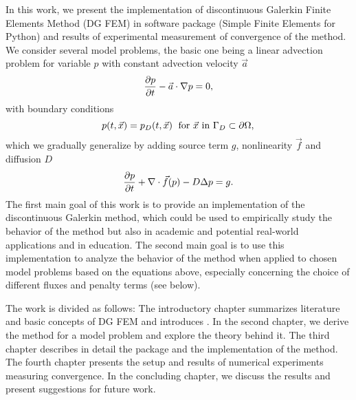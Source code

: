In this work, we present the implementation of discontinuous Galerkin Finite
Elements Method (DG FEM) in software package \sfepy{} (Simple Finite Elements
for
Python) and results of experimental measurement of convergence of the method.
We consider several model problems, the basic one being a linear
advection problem for variable $p$ with constant advection velocity $\vec{a}$
$$
\frac{\partial p}{\partial t} - \vec{a}\cdot\nabla p = 0,
$$
with boundary conditions
$$
p(t, \vec{x}) = p_D(t, \vec{x}) \; \text{ for } \vec{x} \text{ in } \Gamma_D
\subset
\partial\Omega, \\
$$
which we gradually generalize by adding source term $g$, nonlinearity $\vec{f}$
and diffusion $D$
\begin{equation*}
\frac{\partial p}{\partial t} + \nabla\cdot \vec{f}(p) - D\Delta p = g.
\end{equation*}
The first main goal of this work is to provide an implementation of
the discontinuous Galerkin
method, which could be used to empirically study the behavior of the method but
also in academic and potential real-world applications and in education. The
second main goal is to use this implementation to analyze the behavior of the
method when applied to chosen model problems based on the equations above,
especially concerning the choice of different fluxes and penalty terms (see below).

The work is divided as follows: The introductory chapter summarizes literature
and basic concepts of DG FEM and introduces \sfepy{}. In the second chapter,
we derive the method for a model problem and explore the theory behind it. The
third chapter describes in detail the \sfepy{} package and the implementation of the
method. The fourth chapter presents the setup and results of numerical
experiments measuring convergence. In the concluding chapter, we discuss the
results and present suggestions for future work.

